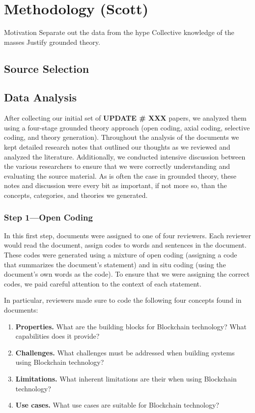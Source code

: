 
\section{Methodology (Scott)}

Motivation
	Separate out the data from the hype
	Collective knowledge of the masses
	Justify grounded theory.

\subsection{Source Selection}

\subsection{Data Analysis}
After collecting our initial set of \textbf{UPDATE \# XXX} papers, we analyzed them using a four-stage grounded theory approach (open coding, axial coding, selective coding, and theory generation).
Throughout the analysis of the documents we kept detailed research notes that outlined our thoughts as we reviewed and analyzed the literature.
Additionally, we conducted intensive discussion between the various researchers to ensure that we were correctly understanding and evaluating the source material.
As is often the case in grounded theory, these notes and discussion were every bit as important, if not more so, than the concepts, categories, and theories we generated.

\subsubsection{Step 1---Open Coding}
In this first step, documents were assigned to one of four reviewers.
Each reviewer would read the document, assign codes to words and sentences in the document.
These codes were generated using a mixture of open coding (assigning a code that summarizes the document's statement) and in situ coding (using the document's own words as the code).
To ensure that we were assigning the correct codes, we paid careful attention to the context of each statement.

In particular, reviewers made sure to code the following four concepts found in documents:
\begin{enumerate}
	\item \textbf{Properties.} What are the building blocks for Blockchain technology? What capabilities does it provide?
	\item \textbf{Challenges.} What challenges must be addressed when building systems using Blockchain technology?
	\item \textbf{Limitations.} What inherent limitations are their when using Blockchain technology?
	\item \textbf{Use cases.} What use cases are suitable for Blockchain technology?
\end{enumerate}

